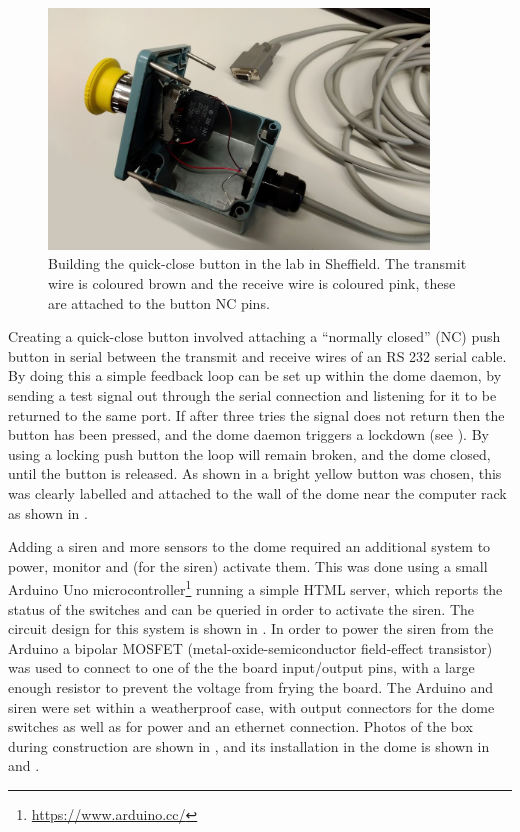 \begin{colsection}
\begin{colsection}
\begin{figure}[t]
    \begin{center}
        \includegraphics[width=0.9\textwidth]{images/button_photo.jpg}
    \end{center}
    \caption[Building the quick-close button]{
        Building the quick-close button in the lab in Sheffield. The transmit wire is coloured brown and the receive wire is coloured pink, these are attached to the button NC pins.
    }\label{fig:quickclose_button}
\end{figure}

Creating a quick-close button involved attaching a ``normally closed'' (NC) push button in serial between the transmit and receive wires of an RS 232 serial cable. By doing this a simple feedback loop can be set up within the dome daemon, by sending a test signal out through the serial connection and listening for it to be returned to the same port. If after three tries the signal does not return then the button has been pressed, and the dome daemon triggers a lockdown (see ). By using a locking push button the loop will remain broken, and the dome closed, until the button is released. As shown in  a bright yellow button was chosen, this was clearly labelled and attached to the wall of the dome near the computer rack as shown in .

Adding a siren and more sensors to the dome required an additional system to power, monitor and (for the siren) activate them. This was done using a small Arduino Uno microcontroller\footnote{\url{https://www.arduino.cc/}} running a simple HTML server, which reports the status of the switches and can be queried in order to activate the siren. The circuit design for this system is shown in . In order to power the siren from the Arduino a bipolar MOSFET (metal-oxide-semiconductor field-effect transistor) was used to connect to one of the the board input/output pins, with a large enough resistor to prevent the voltage from frying the board. The Arduino and siren were set within a weatherproof case, with output connectors for the dome switches as well as for power and an ethernet connection. Photos of the box during construction are shown in , and its installation in the dome is shown in  and .


\end{colsection}
\end{colsection}
